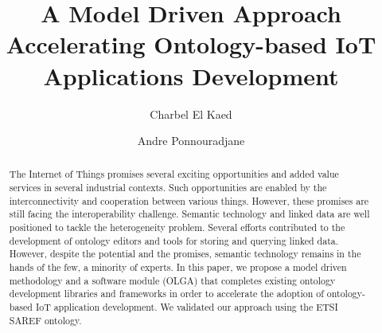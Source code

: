 \documentclass[runningheads,a4paper]{llncs}
\begin{document}
\mainmatter

\title{A Model Driven Approach Accelerating Ontology-based IoT
 Applications Development}
\author{Charbel El Kaed \and
Andre Ponnouradjane}

\maketitle

\begin{abstract}
The Internet of Things promises several exciting opportunities and added value services in several industrial contexts. Such opportunities are enabled by the interconnectivity and cooperation between various things. However, these promises are still facing the interoperability challenge. Semantic technology and linked data are well positioned to tackle the heterogeneity problem. Several efforts contributed to the development of ontology editors and tools for storing and querying linked data. However, despite the potential and the promises, semantic technology remains in the hands of the few, a minority of experts. In this paper, we propose a model driven methodology and a software module (OLGA) that completes existing ontology development libraries and frameworks in order to accelerate the adoption of ontology-based IoT application development. We validated our approach using the ETSI SAREF ontology.

\end{abstract}
\end{document}
